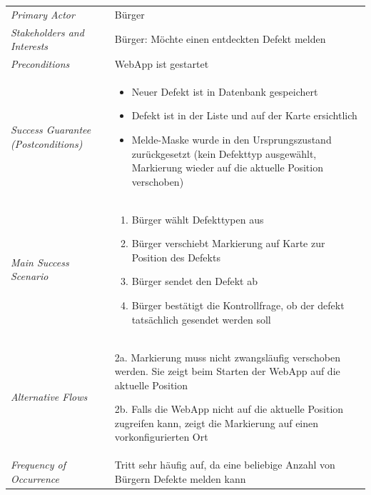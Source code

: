 \renewcommand{\arraystretch}{2}
\begin{longtable}{p{0.25\twocelltabwidth}p{0.75\twocelltabwidth}}
\textit{Primary Actor} & Bürger \\ 
\textit{Stakeholders and Interests} & Bürger: Möchte einen entdeckten Defekt melden \\ 
\textit{Preconditions} & \gls{WebApp} ist gestartet \\ 
\textit{Success Guarantee (Postconditions)} & \begin{itemize}[noitemsep, nosep, leftmargin=12pt, before*={\mbox{}\vspace{-\baselineskip}}, after*={\mbox{}\vspace{-\baselineskip}}]
\item Neuer Defekt ist in Datenbank gespeichert
\item Defekt ist in der Liste und auf der Karte ersichtlich
\item Melde-Maske wurde in den Ursprungszustand zurückgesetzt (kein Defekttyp ausgewählt, Markierung wieder auf die aktuelle Position verschoben)
\end{itemize} \\ 
\textit{Main Success Scenario} & \begin{enumerate}[noitemsep, nosep, leftmargin=12pt, before*={\mbox{}\vspace{-\baselineskip}}, after*={\mbox{}\vspace{-\baselineskip}}]
\item Bürger wählt Defekttypen aus
\item Bürger verschiebt Markierung auf Karte zur Position des Defekts
\item Bürger sendet den Defekt ab
\item Bürger bestätigt die Kontrollfrage, ob der defekt tatsächlich gesendet werden soll
\end{enumerate} \\ 
\textit{Alternative Flows} & 2a. Markierung muss nicht zwangsläufig verschoben werden. Sie zeigt beim Starten der \gls{WebApp} auf die aktuelle Position

2b. Falls die \gls{WebApp} nicht auf die aktuelle Position zugreifen kann, zeigt die Markierung auf einen vorkonfigurierten Ort \\ 
\textit{Frequency of Occurrence} & Tritt sehr häufig auf, da eine beliebige Anzahl von Bürgern Defekte melden kann \\ 
\end{longtable} 
\renewcommand{\arraystretch}{1.3}

